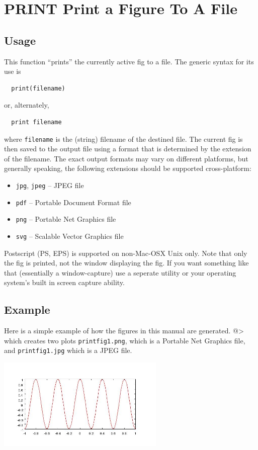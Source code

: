 \section{PRINT Print a Figure To A File}

\subsection{Usage}

This function ``prints'' the currently active fig to a file.  The 
generic syntax for its use is
\begin{verbatim}
  print(filename)
\end{verbatim}
or, alternately,
\begin{verbatim}
  print filename
\end{verbatim}
where \verb|filename| is the (string) filename of the destined file.  The current
fig is then saved to the output file using a format that is determined
by the extension of the filename.  The exact output formats may vary on
different platforms, but generally speaking, the following extensions
should be supported cross-platform:
\begin{itemize}
\item  \verb|jpg|, \verb|jpeg|  --  JPEG file 

\item  \verb|pdf| -- Portable Document Format file

\item  \verb|png| -- Portable Net Graphics file

\item  \verb|svg| -- Scalable Vector Graphics file

\end{itemize}
Postscript (PS, EPS) is supported on non-Mac-OSX Unix only.
Note that only the fig is printed, not the window displaying
the fig.  If you want something like that (essentially a window-capture)
use a seperate utility or your operating system's built in screen
capture ability.
\subsection{Example}

Here is a simple example of how the figures in this manual are generated.
@>
which creates two plots \verb|printfig1.png|, which is a Portable
Net Graphics file, and \verb|printfig1.jpg| which is a JPEG file.


\centerline{\includegraphics[width=8cm]{printfig1}}

